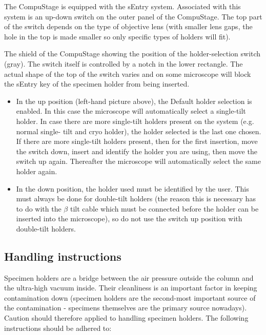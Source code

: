 \documentclass[12pt]{article}
\begin{document}
The CompuStage is equipped with the sEntry system. Associated with this
system is an up-down switch on the outer panel of the CompuStage. The
top part of the switch depends on the type of objective lens
(with smaller lens gaps, the hole in the top is made smaller so only
specific types of holders will fit).

The shield of the CompuStage showing the position of the
holder-selection switch (gray). The switch itself is controlled by a
notch in the lower rectangle. The actual shape of the top of the switch
varies and on some microscope will block the sEntry key of the specimen
holder from being inserted.

\begin{itemize}
\item  In the up position (left-hand picture above), the Default holder
selection is enabled. In this case the microscope will automatically
select a single-tilt holder. In case there are more single-tilt holders
present on the system (e.g. normal single- tilt and cryo holder), the
holder selected is the last one chosen. If there are more single-tilt
holders present, then for the first insertion, move the switch
down, insert and identify the holder you are using, then move the
switch up again. Thereafter the microscope will automatically select
the same holder again.

\item  In the down position, the holder used must be identified by the
user. This must always be done for double-tilt holders (the reason this
is necessary has to do with the $\beta$ tilt cable which must be
connected before the holder can be inserted into the microscope), so do
not use the switch up position with double-tilt holders.
\end{itemize}

\subsection{Handling instructions}

Specimen holders are a bridge between the air pressure outside the
column and the ultra-high vacuum inside. Their cleanliness is an
important factor in keeping contamination down (specimen holders are the
second-most important source of the contamination - specimens themselves
are the primary source nowadays). Caution should therefore applied to
handling specimen holders. The following instructions should be
adhered to:
\end{document}
